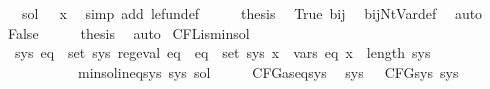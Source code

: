 \begin{isabellebody}
\ {\isachardoublequoteopen}{\isasymdots}\ {\isasymsubseteq}\ sol{\isacharprime}{\kern0pt}\ {\isacharparenleft}{\kern0pt}{\isasymgamma}{\isacharprime}{\kern0pt}\ {\isacharparenleft}{\kern0pt}{\isasymgamma}\ x{\isacharparenright}{\kern0pt}{\isacharparenright}{\kern0pt}{\isachardoublequoteclose}\ \isamarkupfalse%
\ {\isacharparenleft}{\kern0pt}simp\ add{\isacharcolon}{\kern0pt}\ le{\isacharunderscore}{\kern0pt}fun{\isacharunderscore}{\kern0pt}def{\isacharparenright}{\kern0pt}\isanewline
\ \ \isamarkupfalse%
\ \isamarkupfalse%
\ {\isacharquery}{\kern0pt}thesis\ \isamarkupfalse%
\ True\ bij{\isacharunderscore}{\kern0pt}{\isasymgamma}{\isacharunderscore}{\kern0pt}{\isasymgamma}{\isacharprime}{\kern0pt}\ \isamarkupfalse%
\ bij{\isacharunderscore}{\kern0pt}Nt{\isacharunderscore}{\kern0pt}Var{\isacharunderscore}{\kern0pt}def\ \isamarkupfalse%
\ auto\isanewline
{}\isamarkupfalse%
\isanewline
\ \ \isamarkupfalse%
\ False\isanewline
\ \ \isamarkupfalse%
\ \isamarkupfalse%
\ {\isacharquery}{\kern0pt}thesis\ \isamarkupfalse%
\ auto\isanewline
{}\isamarkupfalse%
%
\endisatagproof
{\isafoldproof}%
%
\isadelimproof
\isanewline
%
\endisadelimproof
\isanewline
{}\isamarkupfalse%
\ CFL{\isacharunderscore}{\kern0pt}is{\isacharunderscore}{\kern0pt}min{\isacharunderscore}{\kern0pt}sol{\isacharcolon}{\kern0pt}\isanewline
\ \ {\isachardoublequoteopen}{\isasymexists}sys{\isachardot}{\kern0pt}\ {\isacharparenleft}{\kern0pt}{\isasymforall}eq\ {\isasymin}\ set\ sys{\isachardot}{\kern0pt}\ reg{\isacharunderscore}{\kern0pt}eval\ eq{\isacharparenright}{\kern0pt}\ {\isasymand}\ {\isacharparenleft}{\kern0pt}{\isasymforall}eq\ {\isasymin}\ set\ sys{\isachardot}{\kern0pt}\ {\isasymforall}x\ {\isasymin}\ vars\ eq{\isachardot}{\kern0pt}\ x\ {\isacharless}{\kern0pt}\ length\ sys{\isacharparenright}{\kern0pt}\isanewline
\ \ \ \ \ \ \ \ \ \ {\isasymand}\ min{\isacharunderscore}{\kern0pt}sol{\isacharunderscore}{\kern0pt}ineq{\isacharunderscore}{\kern0pt}sys\ sys\ sol{\isachardoublequoteclose}\isanewline
%
\isadelimproof
%
\endisadelimproof
%
\isatagproof
{}\isamarkupfalse%
\ {\isacharminus}{\kern0pt}\isanewline
\ \ \isamarkupfalse%
\ CFG{\isacharunderscore}{\kern0pt}as{\isacharunderscore}{\kern0pt}eq{\isacharunderscore}{\kern0pt}sys\ \isamarkupfalse%
\ sys\ \ {\isacharasterisk}{\kern0pt}{\isacharcolon}{\kern0pt}\ {\isachardoublequoteopen}CFG{\isacharunderscore}{\kern0pt}sys\ sys{\isachardoublequoteclose}\ \isamarkupfalse%

\end{isabellebody}

